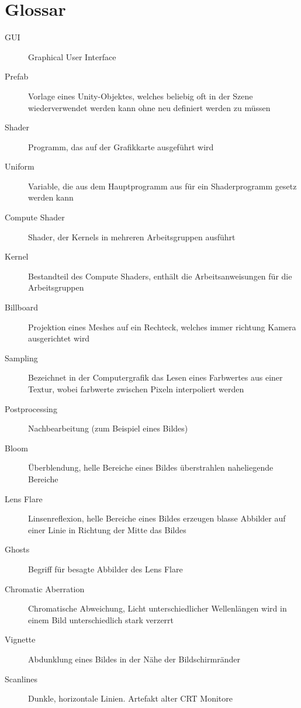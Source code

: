 \documentclass[a4paper,ngerman,12pt]{report}
\begin{document}
\lipsum[1]





\chapter{Glossar}

\begin{description}
\item[GUI] Graphical User Interface
\item[Prefab] Vorlage eines Unity-Objektes, welches beliebig oft in der Szene wiederverwendet werden kann ohne neu definiert werden zu müssen
\vspace{5mm}
\item[Shader] Programm, das auf der Grafikkarte ausgeführt wird
\item[Uniform] Variable, die aus dem Hauptprogramm aus für ein Shaderprogramm gesetz werden kann
\item[Compute Shader] Shader, der Kernels in mehreren Arbeitsgruppen ausführt
\item[Kernel] Bestandteil des Compute Shaders, enthält die Arbeitsanweisungen für die Arbeitsgruppen
\item[Billboard] Projektion eines Meshes auf ein Rechteck, welches immer richtung Kamera ausgerichtet wird
\item[Sampling] Bezeichnet in der Computergrafik das Lesen eines Farbwertes aus einer Textur, wobei farbwerte zwischen Pixeln interpoliert werden
\vspace{5mm}
\item[Postprocessing] Nachbearbeitung (zum Beispiel eines Bildes)
\item[Bloom] Überblendung, helle Bereiche eines Bildes überstrahlen naheliegende Bereiche
\item[Lens Flare] Linsenreflexion, helle Bereiche eines Bildes erzeugen blasse Abbilder auf einer Linie in Richtung der Mitte das Bildes
\item[Ghosts] Begriff für besagte Abbilder des Lens Flare
\item[Chromatic Aberration] Chromatische Abweichung, Licht unterschiedlicher Wellenlängen wird in einem Bild unterschiedlich stark verzerrt
\item[Vignette] Abdunklung eines Bildes in der Nähe der Bildschirmränder
\item[Scanlines] Dunkle, horizontale Linien. Artefakt alter CRT Monitore
\end{description}
\end{document}
